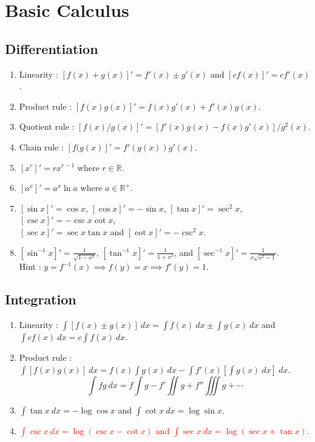 \section{Basic Calculus}
\subsection{Differentiation}
\begin{enumerate}
	\item Linearity : $[f(x)+g(x)]' = f'(x) \pm g'(x)$ and $[cf(x)]' = cf'(x)$.
	\item Product rule : $[f(x)g(x)]' = f(x)g'(x) + f'(x)g(x)$.
	\item Quotient rule : $[f(x)/g(x)]' = [f'(x)g(x) - f(x)g'(x)]/g^2(x)$.
	\item Chain rule : $[f(g(x)]' = f'(g(x)) g'(x)$.
	\item $[x^r]' = rx^{r-1}$ where $r \in \mathbb{R}$.
	\item $[a^x]' = a^x \ln a$ where $a \in \mathbb{R}^+$.
	\item $[\sin x]' = \cos x$, $[\cos x]' = -\sin x$, $[\tan x]' = \sec^2 x$, $[\csc x]' = -\csc x \cot x$,\\ $[\sec x]' = \sec x \tan x$ and $[\cot x]' = -\csc^2 x$.
	\item $[\sin^{-1}x]' = \frac{1}{\sqrt{1-x^2}}$, $[\tan^{-1}x]' = \frac{1}{1+x^2}$, and $[\sec^{-1}x]' = \frac{1}{x\sqrt{x^2-1}}$.\\ Hint : $y = f^{-1}(x) \implies f(y) = x \implies f'(y) = 1$.
\end{enumerate}

\subsection{Integration}
\begin{enumerate}
	\item Linearity : $\int [f(x) \pm g(x)]\ dx = \int f(x)\ dx \pm \int g(x)\ dx$ and $\int cf(x)\ dx = c \int f(x)\ dx$.
	\item Product rule : $\int [f(x)g(x)]\ dx = f(x)\int g(x)\ dx - \int f'(x) \left[\int g(x)\ dx\right]\ dx$.
		{\color{blue}
		$$\int fg\ dx = f\int g - f'\iint g + f''\iiint g + \dotsb $$
		}
	\item $\int \tan x\ dx = -\log \cos x$ and $\int \cot x\ dx = \log \sin x$.
	\item \textcolor{red}{$\int \csc x\ dx = \log (\csc x - \cot x)$ and $\int \sec x\ dx = \log (\sec x + \tan x)$.}
\end{enumerate}

